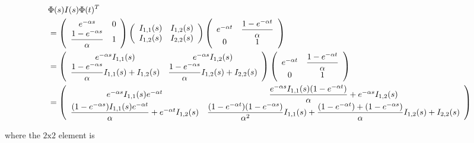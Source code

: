 \documentclass{article}
\numberwithin{questioncounter}{section}
\begin{document}
\begin{solution}
\begin{align*}
& \Phi(s) I(s) \Phi(t)^{T} \\
&= \left(\begin{array}{c c} e^{-\alpha s} & 0 \\ \dfrac{1 - e^{-\alpha s}}{\alpha} & 1 \end{array} \right)\left(\begin{array}{c c} I_{1,1}(s) & I_{1,2}(s) \\ I_{1,2}(s) & I_{2,2}(s) \end{array}\right) \left(\begin{array}{c c} e^{-\alpha t} & \dfrac{1 - e^{-\alpha t}}{\alpha} \\ 0 & 1 \end{array} \right) \\
&= \left(\begin{array}{c c} e^{-\alpha s} I_{1,1}(s) & e^{-\alpha s} I_{1,2}(s) \\ \dfrac{1 - e^{-\alpha s}}{\alpha} I_{1,1}(s) + I_{1,2}(s) & \dfrac{1 - e^{-\alpha s}}{\alpha} I_{1,2}(s) + I_{2,2}(s) \end{array} \right)\left(\begin{array}{c c} e^{-\alpha t} & \dfrac{1 - e^{-\alpha t}}{\alpha} \\ 0 & 1 \end{array} \right) \\
&= \left(\begin{array}{c c} e^{-\alpha s} I_{1,1}(s) e^{-\alpha t} & \dfrac{e^{-\alpha s} I_{1,1}(s) (1 - e^{-\alpha t})}{\alpha} + e^{-\alpha s} I_{1,2}(s) \\
\dfrac{(1 - e^{-\alpha s})I_{1,1}(s) e^{-\alpha t}}{\alpha} + e^{-\alpha t} I_{1,2}(s) & \dfrac{(1 - e^{-\alpha t})(1 - e^{-\alpha s})}{\alpha^2} I_{1,1}(s) + \dfrac{(1 - e^{-\alpha t}) + (1 - e^{-\alpha s})}{\alpha} I_{1,2}(s) + I_{2,2}(s) \end{array}\right)
\end{align*}

where the $2\text{x}2$ element is


\end{solution}
\end{document}
